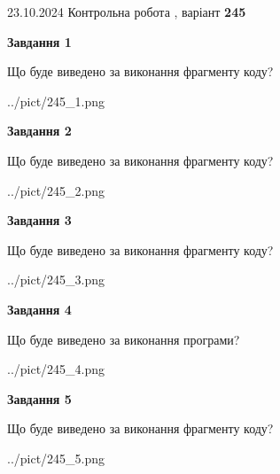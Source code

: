 \documentclass[12pt, ukrainian]{article}
\begin{document}
{\Large{23.10.2024 Контрольна робота , варіант  \No \textbf { 245 }\par}}
{
\begin {large}
{\begin {center}\textbf{Завдання 1}\end {center}}

Що буде виведено за виконання фрагменту коду?\par
\begin{center}
	{../pict/245_1.png}
\end{center}
\newpage

{\begin {center}\textbf{Завдання 2}\end {center}}

Що буде виведено за виконання фрагменту коду?\par
\begin{center}
	{../pict/245_2.png}
\end{center}
\newpage

{\begin {center}\textbf{Завдання 3}\end {center}}

Що буде виведено за виконання фрагменту коду?\par
\begin{center}
	{../pict/245_3.png}
\end{center}
\newpage

{\begin {center}\textbf{Завдання 4}\end {center}}

Що буде виведено за виконання програми?\par
\begin{center}
	{../pict/245_4.png}
\end{center}
\newpage

{\begin {center}\textbf{Завдання 5}\end {center}}

Що буде виведено за виконання фрагменту коду?\par
\begin{center}
	{../pict/245_5.png}
\end{center}
\newpage


\end{large}}
\end{document}
